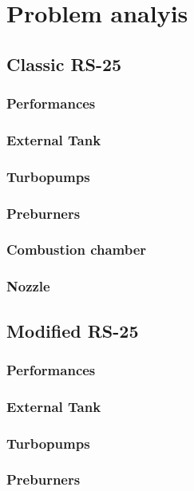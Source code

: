 \section{Problem analyis}
\subsection{Classic RS-25}
\subsubsection{Performances}
\subsubsection{External Tank}
\subsubsection{Turbopumps}
\subsubsection{Preburners}
\subsubsection{Combustion chamber}
\subsubsection{Nozzle}
\subsection{Modified RS-25}
\subsubsection{Performances}
\subsubsection{External Tank}
\subsubsection{Turbopumps}
\subsubsection{Preburners}

